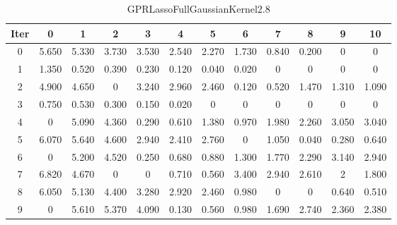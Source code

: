\begin{table}
	\begin{center}
		\begin{tabular}{|c|c|c|c|c|c|c|c|c|c|c|c|}
			\hline
			Iter & 0 & 1 & 2 & 3 & 4 & 5 & 6 & 7 & 8 & 9 & 10 \\
			\hline
			0 & 5.650 & 5.330 & 3.730 & 3.530 & 2.540 & 2.270 & 1.730 & 0.840 & 0.200 & 0 & 0 \\
			\hline
			1 & 1.350 & 0.520 & 0.390 & 0.230 & 0.120 & 0.040 & 0.020 & 0 & 0 & 0 & 0 \\
			\hline
			2 & 4.900 & 4.650 & 0 & 3.240 & 2.960 & 2.460 & 0.120 & 0.520 & 1.470 & 1.310 & 1.090 \\
			\hline
			3 & 0.750 & 0.530 & 0.300 & 0.150 & 0.020 & 0 & 0 & 0 & 0 & 0 & 0 \\
			\hline
			4 & 0 & 5.090 & 4.360 & 0.290 & 0.610 & 1.380 & 0.970 & 1.980 & 2.260 & 3.050 & 3.040 \\
			\hline
			5 & 6.070 & 5.640 & 4.600 & 2.940 & 2.410 & 2.760 & 0 & 1.050 & 0.040 & 0.280 & 0.640 \\
			\hline
			6 & 0 & 5.200 & 4.520 & 0.250 & 0.680 & 0.880 & 1.300 & 1.770 & 2.290 & 3.140 & 2.940 \\
			\hline
			7 & 6.820 & 4.670 & 0 & 0 & 0.710 & 0.560 & 3.400 & 2.940 & 2.610 & 2 & 1.800 \\
			\hline
			8 & 6.050 & 5.130 & 4.400 & 3.280 & 2.920 & 2.460 & 0.980 & 0 & 0 & 0.640 & 0.510 \\
			\hline
			9 & 0 & 5.610 & 5.370 & 4.090 & 0.130 & 0.560 & 0.980 & 1.690 & 2.740 & 2.360 & 2.380 \\
			\hline
		\end{tabular}
	\end{center}
	\caption{GPRLassoFullGaussianKernel2.8}
\end{table}
